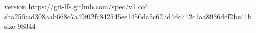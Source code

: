version https://git-lfs.github.com/spec/v1
oid sha256:ad308aab668c7a49f02fc842545ee1456da5c627d4dc712c1aa8936dcf2be41b
size 98344
